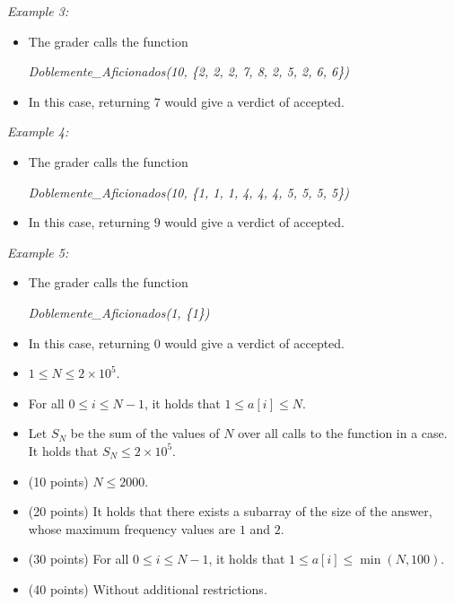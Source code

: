 \documentclass[12pt]{scrartcl}
\begin{document}
        {\itshape Example 3:}
        \begin{itemize}
            \item The grader calls the function 
            
            \begin{center}
                {\itshape Doblemente\_Aficionados(10, \{2, 2, 2, 7, 8, 2, 5, 2, 6, 6\})}
            \end{center}

            \item In this case, returning $7$ would give a verdict of accepted.
        \end{itemize}

        {\itshape Example 4:}
        \begin{itemize}
            \item The grader calls the function 

            \begin{center}
                {\itshape Doblemente\_Aficionados(10, \{1, 1, 1, 4, 4, 4, 5, 5, 5, 5\})}
            \end{center}

            \item In this case, returning $9$ would give a verdict of accepted.
        \end{itemize}
        
        {\itshape Example 5:}
        \begin{itemize}
            \item The grader calls the function 

            \begin{center}
                {\itshape Doblemente\_Aficionados(1, \{1\})}
            \end{center}

            \item In this case, returning $0$ would give a verdict of accepted.
        \end{itemize}
        
        \begin{itemize}
            \item $1 \le N \le 2 \times 10^5$.
            \item For all $0 \le i \le N - 1$, it holds that $1 \le a[i] \le N$.
            \item Let $S_N$ be the sum of the values of $N$ over all calls to the function in a case. It holds that $S_N \le 2\times10^5$.
        \end{itemize}
    

    \begin{itemize}
        \item (10 points) $N \le 2000$.
        \item (20 points) It holds that there exists a subarray of the size of the answer, whose maximum frequency values are $1$ and $2$.
        \item (30 points) For all $0 \le i \le N - 1$, it holds that $1 \le a[i] \le \min(N, 100)$.
        \item (40 points) Without additional restrictions.
    \end{itemize}
\end{document}
